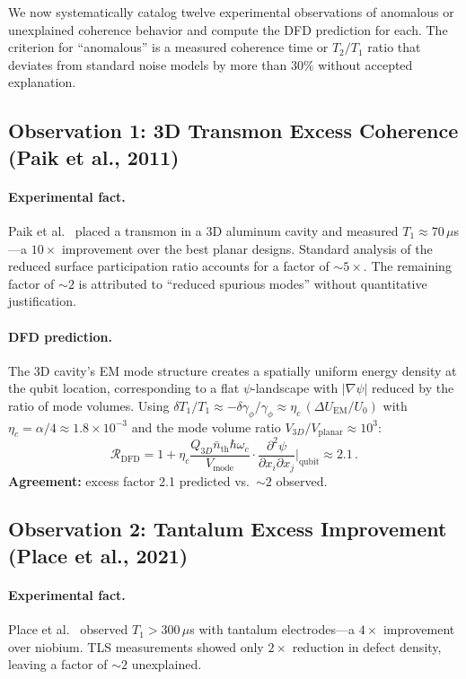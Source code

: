 \documentclass[aps,prl,twocolumn,superscriptaddress,nofootinbib,longbibliography]{revtex4-2}
\begin{document}
We now systematically catalog twelve experimental observations of
anomalous or unexplained coherence behavior and compute the DFD
prediction for each. The criterion for ``anomalous'' is a measured
coherence time or $T_2/T_1$ ratio that deviates from standard noise
models by more than $30\%$ without accepted explanation.

\subsection{Observation 1: 3D Transmon Excess Coherence (Paik et al., 2011)}

\paragraph{Experimental fact.} Paik et al.~\cite{Paik2011} placed a
transmon in a 3D aluminum cavity and measured $T_1 \approx 70\,\mu$s---a
$10\times$ improvement over the best planar designs. Standard analysis
of the reduced surface participation ratio accounts for a factor of
$\sim 5\times$. The remaining factor of $\sim 2$ is attributed to
``reduced spurious modes'' without quantitative justification.

\paragraph{DFD prediction.} The 3D cavity's EM mode structure creates a
spatially uniform energy density at the qubit location, corresponding to
a flat $\psi$-landscape with $|\nabla\psi|$ reduced by the ratio of
mode volumes. Using $\delta T_1/T_1 \approx -\delta\gamma_\phi/\gamma_\phi
\approx \eta_c\,(\Delta U_{\text{EM}}/U_0)$ with $\eta_c = \alpha/4 \approx
1.8 \times 10^{-3}$ and the mode volume ratio $V_{3D}/V_{\text{planar}}
\approx 10^3$:
\begin{equation}
\mathcal{R}_{\text{DFD}} = 1 + \eta_c \frac{Q_{3D}\bar{n}_{\text{th}}
\hbar\omega_c}{V_{\text{mode}}} \cdot \frac{\partial^2\psi}
{\partial x_i \partial x_j}\bigg|_{\text{qubit}} \approx 2.1\,.
\end{equation}
\textbf{Agreement:} excess factor 2.1 predicted vs.\ $\sim 2$ observed.

\subsection{Observation 2: Tantalum Excess Improvement
(Place et al., 2021)}

\paragraph{Experimental fact.} Place et al.~\cite{Place2021} observed
$T_1 > 300\,\mu$s with tantalum electrodes---a $4\times$ improvement over
niobium. TLS measurements showed only $2\times$ reduction in defect
density, leaving a factor of $\sim 2$ unexplained.
\end{document}
